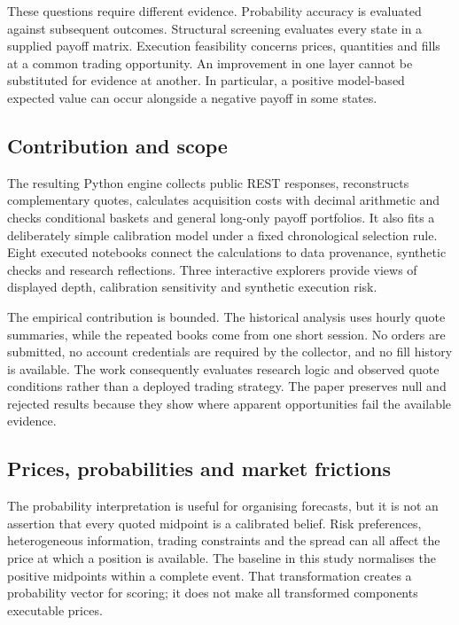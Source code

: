 These questions require different evidence. Probability accuracy is evaluated against subsequent outcomes. Structural screening evaluates every state in a supplied payoff matrix. Execution feasibility concerns prices, quantities and fills at a common trading opportunity. An improvement in one layer cannot be substituted for evidence at another. In particular, a positive model-based expected value can occur alongside a negative payoff in some states.

\subsection{Contribution and scope}
The resulting Python engine collects public REST responses, reconstructs complementary quotes, calculates acquisition costs with decimal arithmetic and checks conditional baskets and general long-only payoff portfolios. It also fits a deliberately simple calibration model under a fixed chronological selection rule. Eight executed notebooks connect the calculations to data provenance, synthetic checks and research reflections. Three interactive explorers provide views of displayed depth, calibration sensitivity and synthetic execution risk.

The empirical contribution is bounded. The historical analysis uses hourly quote summaries, while the repeated books come from one short session. No orders are submitted, no account credentials are required by the collector, and no fill history is available. The work consequently evaluates research logic and observed quote conditions rather than a deployed trading strategy. The paper preserves null and rejected results because they show where apparent opportunities fail the available evidence.

\label{sec:foundations}
\subsection{Prices, probabilities and market frictions}
The probability interpretation is useful for organising forecasts, but it is not an assertion that every quoted midpoint is a calibrated belief. Risk preferences, heterogeneous information, trading constraints and the spread can all affect the price at which a position is available. The baseline in this study normalises the positive midpoints within a complete event. That transformation creates a probability vector for scoring; it does not make all transformed components executable prices.

